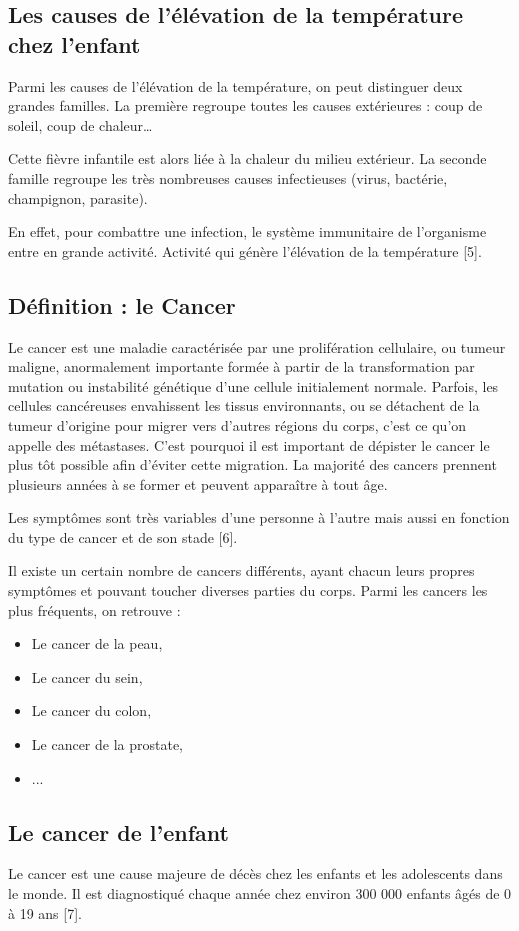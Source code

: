 \documentclass[12pt]{article}
\begin{document}
\subsection{Les causes de l'élévation de la température chez l’enfant}
Parmi les causes de l'élévation de la température, on peut distinguer deux grandes familles. La première regroupe toutes les causes extérieures : coup de soleil, coup de chaleur… 

Cette fièvre infantile est alors liée à la chaleur du milieu extérieur. La seconde famille regroupe les très nombreuses causes infectieuses (virus, bactérie, champignon, parasite).

En effet, pour combattre une infection, le système immunitaire de l’organisme entre en grande activité. Activité qui génère l’élévation de la température [5].

\subsection{Définition : le Cancer}
Le cancer est une maladie caractérisée par une prolifération cellulaire, ou tumeur maligne, anormalement importante formée à partir de la transformation par mutation ou instabilité génétique d'une cellule initialement normale. Parfois, les cellules cancéreuses envahissent les tissus environnants, ou se détachent de la tumeur d'origine pour migrer vers d'autres régions du corps, c'est ce qu'on appelle des métastases. C'est pourquoi il est important de dépister le cancer le plus tôt possible afin d'éviter cette migration. La majorité des cancers prennent plusieurs années à se former et peuvent apparaître à tout âge. 

Les symptômes sont très variables d'une personne à l'autre mais aussi en fonction du type de cancer et de son stade [6].

Il existe un certain nombre de cancers différents, ayant chacun leurs propres symptômes et pouvant toucher diverses parties du corps. Parmi les cancers les plus fréquents, on retrouve :
\begin{itemize}
	\item  Le cancer de la peau,
	\item Le cancer du sein,
	\item Le cancer du colon,
	\item Le cancer de la prostate,
	\item ...
\end{itemize}

\subsection{Le cancer de l’enfant}
Le cancer est une cause majeure de décès chez les enfants et les adolescents dans le monde. Il est diagnostiqué chaque année chez environ 300 000 enfants âgés de 0 à 19 ans [7].
\end{document}

